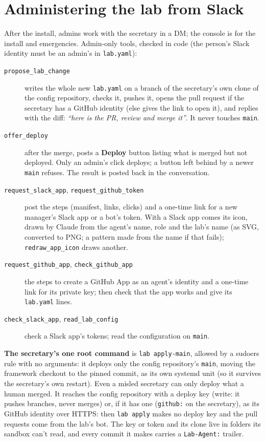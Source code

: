 \documentclass[11pt]{article}
\newcommand{\code}[1]{\texttt{#1}}
\begin{document}
\section{Administering the lab from Slack}\label{sec:selfadmin}

After the install, admins work with the secretary in a DM; the console is for the install
and emergencies. Admin-only tools, checked in code (the person's Slack identity must be an
admin's in \code{lab.yaml}):
\begin{description}
  \item[\code{propose\_lab\_change}] writes the whole new \code{lab.yaml} on a branch of the
    secretary's own clone of the config repository, checks it, pushes it, opens the pull
    request if the secretary has a GitHub identity (else gives the link to open it), and
    replies with the diff: \emph{``here is the PR, review and merge it''}. It never touches
    \code{main}.
  \item[\code{offer\_deploy}] after the merge, posts a \textbf{Deploy} button listing what
    is merged but not deployed. Only an admin's click deploys; a button left behind by a
    newer \code{main} refuses. The result is posted back in the conversation.
  \item[\code{request\_slack\_app}, \code{request\_github\_token}] post the steps (manifest,
    links, clicks) and a one-time link for a new manager's Slack app or a bot's token. With
    a Slack app comes its icon, drawn by Claude from the agent's name, role and the lab's name (as SVG, converted to
    PNG; a pattern made from the name if that fails); \code{redraw\_app\_icon} draws
    another.
  \item[\code{request\_github\_app}, \code{check\_github\_app}] the steps to create a GitHub
    App as an agent's identity and a one-time link for its private key; then check that
    the app works and give its \code{lab.yaml} lines.
  \item[\code{check\_slack\_app}, \code{read\_lab\_config}] check a Slack app's tokens; read
    the configuration on \code{main}.
\end{description}

\textbf{The secretary's one root command} is \code{lab apply-main}, allowed by a sudoers
rule with no arguments: it deploys only the config repository's \code{main}, moving the
framework checkout to the pinned commit, as its own systemd unit (so it survives the
secretary's own restart). Even a misled secretary can only deploy what a human merged.
It reaches the config repository with a deploy key (write: it pushes branches, never
merges) or, if it has one (\code{github:} on the secretary), as its GitHub identity over
HTTPS: then \code{lab apply} makes no deploy key and the pull requests come from the lab's
bot. The key or token and its clone live in folders its sandbox can't read, and every
commit it makes carries a \code{Lab-Agent:} trailer.
\end{document}
